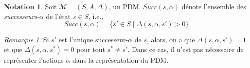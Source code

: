 \documentclass[12pt,a4paper]{report}
\theoremstyle{definition}%
\newtheorem*{notation}{Notation}
\theoremstyle{remark}
\newtheorem{remark}{Remarque}[chapter]
\begin{document}
\begin{notation}
	Soit $\mathcal{M} = (S, A, \Delta)$, un PDM.
		$Succ(s, \alpha)$ dénote l'ensemble des \textit{successeurs}-$\alpha$ de l'état $s
			\in S$, i.e.,
			\[ Succ(s, \alpha) = \{ s' \in S \; | \; \Delta(s, \alpha, s') > 0 \} \]
\end{notation}

\begin{remark}
	Si $s'$ est l'unique successeur-$\alpha$ de $s$, alors, on a que $\Delta(s, \alpha, s') = 1$
	et que $\Delta(s, \alpha, s^*) = 0$ pour tout $s^* \neq s'$.
	Dans ce cas, il n'est pas nécessaire de représenter l'actions $\alpha$
	dans la représentation du PDM.
\end{remark}
\end{document}
